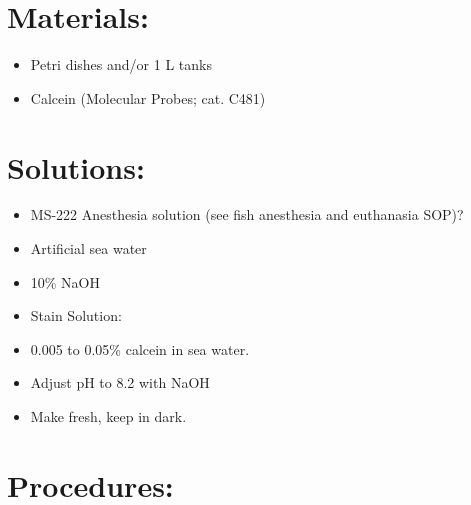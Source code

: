 \documentclass[
  letterpaper,
  DIV=11,
  numbers=noendperiod]{scrreprt}
\providecommand{\tightlist}{%
  \setlength{\itemsep}{0pt}\setlength{\parskip}{0pt}}\usepackage{longtable,booktabs,array}
\begin{document}
\hypertarget{materials-37}{%
\section{Materials:}\label{materials-37}}

\begin{itemize}
\tightlist
\item
  Petri dishes and/or 1 L tanks
\item
  Calcein (Molecular Probes; cat. C481)
\end{itemize}

\hypertarget{solutions-33}{%
\section{Solutions:}\label{solutions-33}}

\begin{itemize}
\tightlist
\item
  MS-222 Anesthesia solution (see fish anesthesia and euthanasia SOP)?
\item
  Artificial sea water
\item
  10\% NaOH
\item
  Stain Solution:
\item
  0.005 to 0.05\% calcein in sea water.
\item
  Adjust pH to 8.2 with NaOH
\item
  Make fresh, keep in dark.
\end{itemize}

\hypertarget{procedures-2}{%
\section{Procedures:}\label{procedures-2}}
\end{document}
